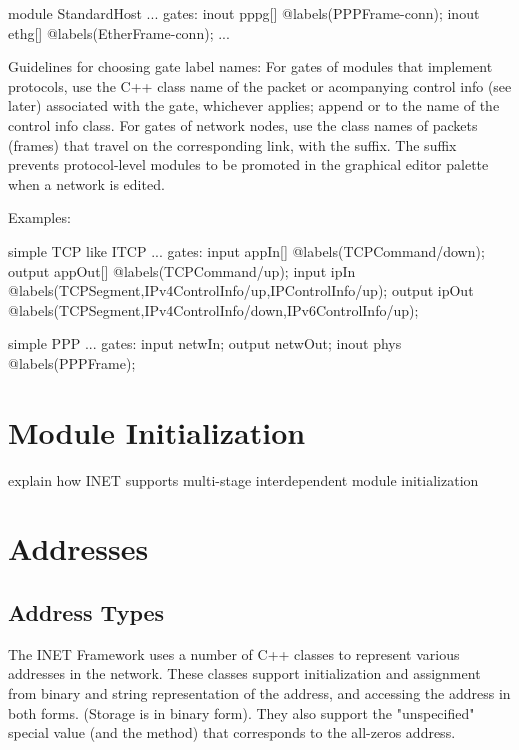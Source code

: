 \begin{ned}
module StandardHost
{
    ...
    gates:
        inout pppg[] @labels(PPPFrame-conn);
        inout ethg[] @labels(EtherFrame-conn);
    ...
}
\end{ned}

Guidelines for choosing gate label names: For gates of modules that
implement protocols, use the C++ class name of the packet or acompanying
control info (see later) associated with the gate, whichever applies;
append  or  to the name of the control info class. For
gates of network nodes, use the class names of packets (frames) that travel
on the corresponding link, with the  suffix. The suffix prevents
protocol-level modules to be promoted in the graphical editor palette when
a network is edited.

Examples:

\begin{ned}
simple TCP like ITCP
{
    ...
    gates:
        input appIn[] @labels(TCPCommand/down);
        output appOut[] @labels(TCPCommand/up);
        input ipIn @labels(TCPSegment,IPv4ControlInfo/up,IPControlInfo/up);
        output ipOut @labels(TCPSegment,IPv4ControlInfo/down,IPv6ControlInfo/up);
}
\end{ned}


\begin{ned}
simple PPP
{
    ...
    gates:
        input netwIn;
        output netwOut;
        inout phys @labels(PPPFrame);
}
\end{ned}
\fi

\section{Module Initialization}

explain how INET supports multi-stage interdependent module initialization



\section{Addresses}

\subsection{Address Types}

The INET Framework uses a number of C++ classes to represent various
addresses in the network. These classes support initialization and
assignment from binary and string representation of the address, and
accessing the address in both forms. (Storage is in binary form). They also
support the "unspecified" special value (and the 
method) that corresponds to the all-zeros address.

